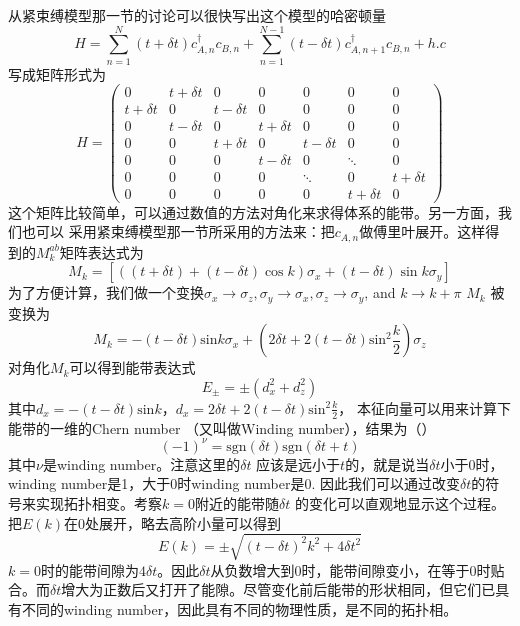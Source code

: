 从紧束缚模型那一节的讨论可以很快写出这个模型的哈密顿量
\begin{equation}
H=\sum_{n=1}^{N}(t+\delta t) c_{A, n}^{\dagger} c_{B, n}+\sum_{n=1}^{N-1}(t-\delta t) c_{A, n+1}^{\dagger} c_{B, n}+h . c
\end{equation}
写成矩阵形式为
\begin{equation}
H=\left(\begin{array}{ccccccc}0 & t+\delta t & 0 & 0 & 0 & 0 & 0 \\ t+\delta t & 0 & t-\delta t & 0 & 0 & 0 & 0 \\ 0 & t-\delta t & 0 & t+\delta t & 0 & 0 & 0 \\ 0 & 0 & t+\delta t & 0 & t-\delta t & 0 & 0 \\ 0 & 0 & 0 & t-\delta t & 0 & \ddots & 0 \\ 0 & 0 & 0 & 0 & \ddots & 0 & t+\delta t \\ 0 & 0 & 0 & 0 & 0 & t+\delta t & 0\end{array}\right)
\end{equation}
这个矩阵比较简单，可以通过数值的方法对角化来求得体系的能带。另一方面，我们也可以
采用紧束缚模型那一节所采用的方法来：把$c_{A, n}$做傅里叶展开。这样得到的$M^{ab}_k$矩阵表达式为
\begin{equation}
  M_k = \left[((t+\delta t)+(t-\delta t) \cos k) \sigma_{x}+(t-\delta t) \sin k \sigma_{y}\right] 
\end{equation}
为了方便计算，我们做一个变换$\sigma_x \rightarrow \sigma_z, \sigma_y
\rightarrow \sigma_x, \sigma_z \rightarrow \sigma_y$, and $k \rightarrow k + \pi$ $M_k$ 被变换为
\begin{equation}
  M_k = -(t - \delta t) \text{sin}k \sigma_x + (2 \delta t + 2 (t - \delta t) \text{sin}^2\frac{k}{2}) \sigma_z
\end{equation}
对角化$M_k$可以得到能带表达式
\begin{equation}
  E_{\pm} = \pm (d_x^2 + d_z^2)
\end{equation}
其中$d_x = -(t - \delta t) \text{sin}k$，$d_x = 2 \delta t + 2 (t - \delta t) \text{sin}^2\frac{k}{2}$， 本征向量可以用来计算下能带的一维的Chern number （又叫做Winding number），结果为（\cite{topoText}）
\begin{equation}
  (-1)^\nu = \text{sgn}(\delta t) \text{sgn}(\delta t + t)
\end{equation}
其中$\nu$是winding number。注意这里的$\delta t$ 应该是远小于$t$的，就是说当$\delta t$小于0时，winding number是1，大于0时winding number是0. 因此我们可以通过改变$\delta t$的符号来实现拓扑相变。考察$k=0$附近的能带随$\delta t$ 的变化可以直观地显示这个过程。把$E(k)$在0处展开，略去高阶小量可以得到
\begin{equation}
  E(k) = \pm \sqrt{(t - \delta t)^2 k^2 + 4 \delta t^2}
\end{equation}
$k = 0$时的能带间隙为$4\delta t$。因此$\delta t$从负数增大到0时，能带间隙变小，在等于0时贴合。而$\delta t$增大为正数后又打开了能隙。尽管变化前后能带的形状相同，但它们已具有不同的winding number，因此具有不同的物理性质，是不同的拓扑相。

